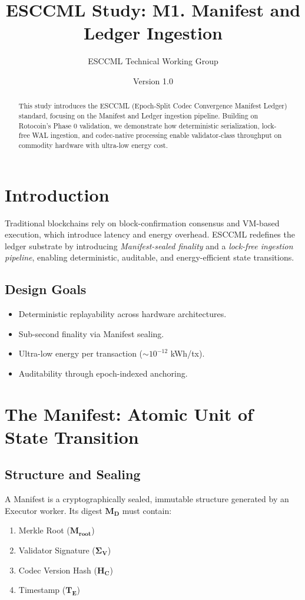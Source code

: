 \documentclass[11pt, a4paper]{article}
\title{\textbf{ESCCML Study: M1. Manifest and Ledger Ingestion}}
\author{ESCCML Technical Working Group}
\date{Version 1.0}
\begin{document}
\maketitle

\begin{abstract}
This study introduces the ESCCML (Epoch-Split Codec Convergence Manifest Ledger) standard,
focusing on the Manifest and Ledger ingestion pipeline. Building on Rotocoin’s Phase 0 validation,
we demonstrate how deterministic serialization, lock-free WAL ingestion, and codec-native processing
enable validator-class throughput on commodity hardware with ultra-low energy cost.
\end{abstract}

\section{Introduction}
Traditional blockchains rely on block-confirmation consensus and VM-based execution, which
introduce latency and energy overhead. ESCCML redefines the ledger substrate by introducing
\emph{Manifest-sealed finality} and a \emph{lock-free ingestion pipeline}, enabling deterministic,
auditable, and energy-efficient state transitions.

\subsection{Design Goals}
\begin{itemize}
    \item Deterministic replayability across hardware architectures.
    \item Sub-second finality via Manifest sealing.
    \item Ultra-low energy per transaction ($\sim 10^{-12}$ kWh/tx).
    \item Auditability through epoch-indexed anchoring.
\end{itemize}

\section{The Manifest: Atomic Unit of State Transition}
\subsection{Structure and Sealing}
A Manifest is a cryptographically sealed, immutable structure generated by an Executor worker.
Its digest $\mathbf{M_D}$ must contain:
\begin{enumerate}
    \item Merkle Root ($\mathbf{M_{root}}$)
    \item Validator Signature ($\mathbf{\Sigma_V}$)
    \item Codec Version Hash ($\mathbf{H_C}$)
    \item Timestamp ($\mathbf{T_E}$)
\end{enumerate}
\end{document}
